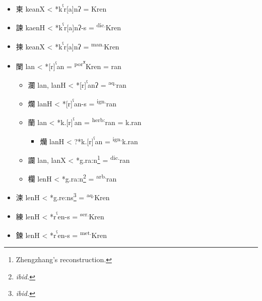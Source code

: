 \documentclass[xetex, svgnames, 12pt]{scrartcl}
\begin{document}
\begin{itemize}
    \item 柬 keanX <  *k\textsuperscript{ˤ}r[a]nʔ = Kren
    \item 諫 kaenH < *k\textsuperscript{ˤ}r[a]nʔ-s = \textsuperscript{dic.}Kren
    \item 揀 keanX < *k\textsuperscript{ˤ}r[a]nʔ = \textsuperscript{man.}Kren
    \item 闌 lan < *[r]\textsuperscript{ˤ}an = \textsuperscript{por\textsuperscript{x}}Kren = ran
    \begin{itemize}
        \item 瀾 lan, lanH < *[r]\textsuperscript{ˤ}anʔ = \textsuperscript{aq.}ran
        \item 爛 lanH < *[r]\textsuperscript{ˤ}an-s = \textsuperscript{ign.}ran
        \item 蘭 lan < *k.[r]\textsuperscript{ˤ}an = \textsuperscript{herb:}ran = k.ran
        \begin{itemize}
            \item 爤 lanH < ?*k.[r]\textsuperscript{ˤ}an = \textsuperscript{ign.}k.ran
        \end{itemize}
        \item 讕 lan, lanX < *g.ra:n\footnote{Zhengzhang's reconstruction.} = \textsuperscript{dic.}ran
        \item 欄 lenH < *g.ra:n\footnote{\textit{ibid.}} = \textsuperscript{arb.}ran
    \end{itemize}
    \item 湅 lenH < *g.re:ns\footnote{\textit{ibid.}} = \textsuperscript{aq.}Kren
    \item 練 lenH < *r\textsuperscript{ˤ}en-s = \textsuperscript{ser.}Kren
    \item 鍊 lenH < *r\textsuperscript{ˤ}en-s = \textsuperscript{met.}Kren
\end{itemize}
\end{document}
